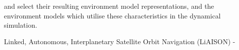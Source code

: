 \begin{enumerate}
            


\end{enumerate}


and select their resulting environment model representations,
and the environment models which utilise these characteristics in the dynamical simulation.

Linked, Autonomous, Interplanetary Satellite Orbit Navigation (LiAISON) - \cite{Hill2006}
